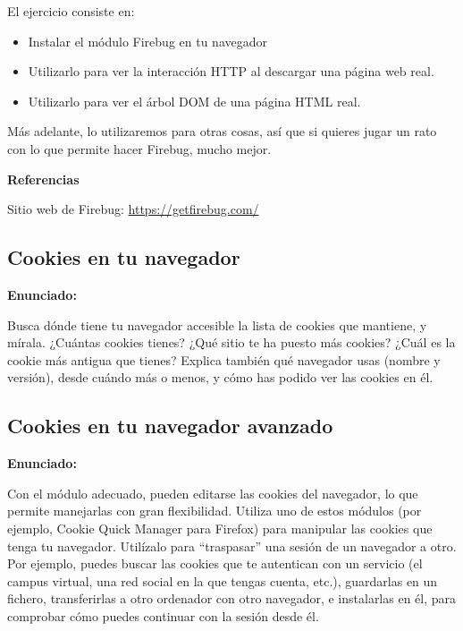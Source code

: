 El ejercicio consiste en:

\begin{itemize}
\item Instalar el módulo Firebug en tu navegador
\item Utilizarlo para ver la interacción HTTP al descargar una página web real.
\item Utilizarlo para ver el árbol DOM de una página HTML real.
\end{itemize}

Más adelante, lo utilizaremos para otras cosas, así que si quieres jugar un rato con lo que permite hacer Firebug, mucho mejor.

\textbf{Referencias}

Sitio web de Firebug: \url{https://getfirebug.com/}


\subsection{Cookies en tu navegador}
\label{subsec:cookies-navegador}

\textbf{Enunciado:}

Busca dónde tiene tu navegador accesible la lista de cookies que mantiene, y mírala. ¿Cuántas cookies tienes? ¿Qué sitio te ha puesto más cookies? ¿Cuál es la cookie más antigua que tienes? Explica también qué navegador usas (nombre y versión), desde cuándo más o menos, y cómo has podido ver las cookies en él.


\subsection{Cookies en tu navegador avanzado}
\label{subsec:cookies-navegador-2}

\textbf{Enunciado:}

Con el módulo adecuado, pueden editarse las cookies del navegador, lo que permite manejarlas con gran flexibilidad. Utiliza uno de estos módulos (por ejemplo, Cookie Quick Manager para Firefox) para manipular las cookies que tenga tu navegador. Utilízalo para ``traspasar'' una sesión de un navegador a otro. Por ejemplo, puedes buscar las cookies que te autentican con un servicio (el campus virtual, una red social en la que tengas cuenta, etc.), guardarlas en un fichero, transferirlas a otro ordenador con otro navegador, e instalarlas en él, para comprobar cómo puedes continuar con la sesión desde él.

